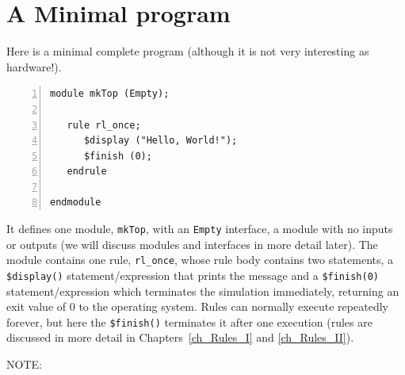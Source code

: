 \section{A Minimal {\BSV} program}

\label{Sec_Hello_World}

Here is a minimal complete {\BSV} program (although it is not very
interesting as hardware!).


{\footnotesize
\begin{Verbatim}[frame=single, numbers=left, label=in file Exercises/Ex-03-A-Hello-World/Top.bsv]
module mkTop (Empty);

   rule rl_once;
      $display ("Hello, World!");
      $finish (0);
   endrule
      
endmodule
\end{Verbatim}
}

It defines one module, \verb|mkTop|, with an \verb|Empty| interface,
{\ie} a module with no inputs or outputs (we will discuss modules and
interfaces in more detail later).  The module contains one rule,
\verb|rl_once|, whose rule body contains two statements, a
\verb|$display()| statement/expression that prints the message and a
\verb|$finish(0)| statement/expression which terminates the simulation
immediately, returning an exit value of 0 to the operating system.
Rules can normally execute repeatedly forever, but here the
\verb|$finish()| terminates it after one execution (rules are
discussed in more detail in Chapters~\ref{ch_Rules_I} and
\ref{ch_Rules_II}).

\vspace{1ex}

NOTE: 

